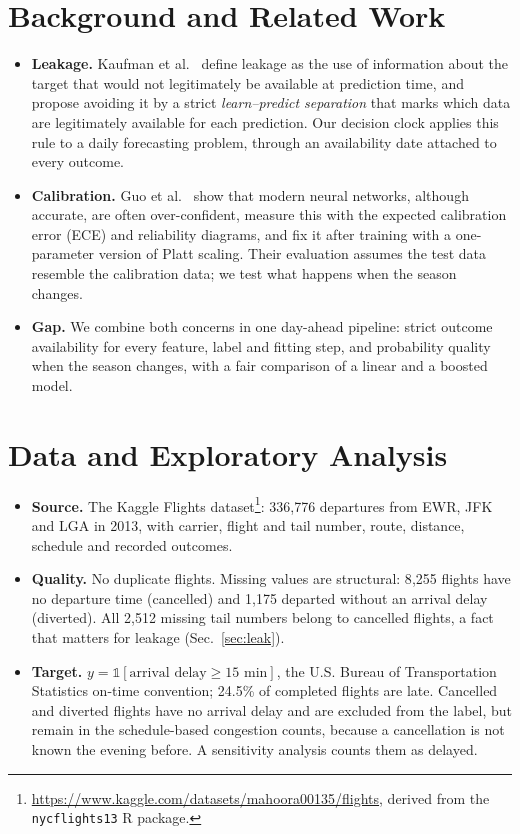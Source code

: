 \documentclass[conference]{IEEEtran}
\begin{document}
\section{Background and Related Work}\label{sec:related}
\begin{itemize}
\item \textbf{Leakage.} Kaufman et al.~\cite{kaufman2012leakage} define leakage as the use of information about the target that would not legitimately be available at prediction time, and propose avoiding it by a strict \emph{learn--predict separation} that marks which data are legitimately available for each prediction. Our decision clock applies this rule to a daily forecasting problem, through an availability date attached to every outcome.
\item \textbf{Calibration.} Guo et al.~\cite{guo2017calibration} show that modern neural networks, although accurate, are often over-confident, measure this with the expected calibration error (ECE) and reliability diagrams, and fix it after training with a one-parameter version of Platt scaling. Their evaluation assumes the test data resemble the calibration data; we test what happens when the season changes.
\item \textbf{Gap.} We combine both concerns in one day-ahead pipeline: strict outcome availability for every feature, label and fitting step, and probability quality when the season changes, with a fair comparison of a linear and a boosted model.
\end{itemize}

\section{Data and Exploratory Analysis}\label{sec:data}
\begin{itemize}
\item \textbf{Source.} The Kaggle Flights dataset\footnote{\url{https://www.kaggle.com/datasets/mahoora00135/flights}, derived from the \texttt{nycflights13} R package.}: 336{,}776 departures from EWR, JFK and LGA in 2013, with carrier, flight and tail number, route, distance, schedule and recorded outcomes.
\item \textbf{Quality.} No duplicate flights. Missing values are structural: 8{,}255 flights have no departure time (cancelled) and 1{,}175 departed without an arrival delay (diverted). All 2{,}512 missing tail numbers belong to cancelled flights, a fact that matters for leakage (Sec.~\ref{sec:leak}).
\item \textbf{Target.} $y=\mathbb{1}[\text{arrival delay}\ge15\text{ min}]$, the U.S. Bureau of Transportation Statistics on-time convention; 24.5\% of completed flights are late. Cancelled and diverted flights have no arrival delay and are excluded from the label, but remain in the schedule-based congestion counts, because a cancellation is not known the evening before. A sensitivity analysis counts them as delayed.
\end{itemize}
\end{document}
